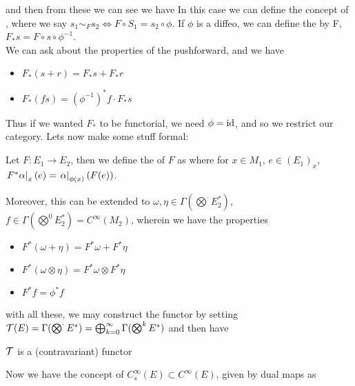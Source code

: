 \documentclass{article}
\begin{document}
and then from these we can see we have
In this case we can define the concept of , where we say $s_1 \sim_F s_2 \Leftrightarrow F \circ S_1 = s_2 \circ \phi$. If $\phi$ is a diffeo, we can define the  by F, $F_\ast s  = F \circ s \circ \phi^{-1}$. \\
We can ask about the properties of the pushforward, and we have 
\begin{itemize}
    \item $F_\ast (s+r) = F_\ast s + F_\ast r $
    \item $F_\ast (fs) = (\phi^{-1})^\ast f \cdot F_\ast s$
\end{itemize}
Thus if we wanted $F_\ast$ to be functorial, we need $\phi=\operatorname{id}$, and so we restrict our category. Lets now make some stuff formal:

\begin{definition}[Pullback]
Let $F : E_1 \to E_2$, then we define the  of $F$ as 
where for $x \in M_1, \, e \in (E_1)_x$, $\left. F^\ast \alpha \right\rvert_{x}(e) = \left. \alpha \right\rvert_{\phi(x)}(F(e))$.
\end{definition}
Moreover, this can be extended to $\omega,\eta \in \Gamma(\bigotimes^\cdot E_2^\ast)$, $f \in \Gamma(\bigotimes^0 E_2^\ast) = C^\infty(M_2)$, wherein we have the properties 
\begin{itemize}
    \item $F^\ast (\omega + \eta) = F^\ast \omega + F^\ast \eta$ 
    \item $F^\ast (\omega \otimes \eta) = F^\ast \omega \otimes F^\ast \eta$
    \item $F^\ast f = \phi^\ast f$
\end{itemize}
with all these, we may construct the functor by setting $\mathcal{T}(E) = \Gamma(\bigotimes^\cdot E^\ast) = \bigoplus_{k=0}^\infty \Gamma(\bigotimes^k E^\ast )$ and then have

\begin{prop}
$\mathcal{T}$ is a (contravariant) functor
\end{prop}

Now we have the concept of  $C^\infty_s(E) \subset C^\infty(E)$, given by dual maps 
as 
\end{document}
